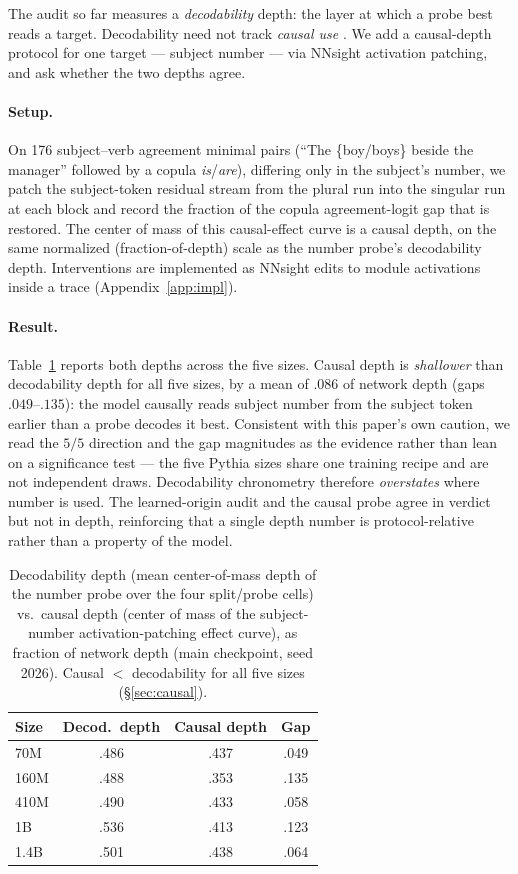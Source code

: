 \documentclass[11pt]{article}
\begin{document}
The audit so far measures a \emph{decodability} depth: the layer at which a probe best reads a target. Decodability need not track \emph{causal use} \citep{ravichander2021probing,elazar2021amnesic}. We add a causal-depth protocol for one target --- subject number --- via NNsight activation patching, and ask whether the two depths agree.

\paragraph{Setup.} On 176 subject--verb agreement minimal pairs (``The \{boy/boys\} beside the manager'' followed by a copula \emph{is}/\emph{are}), differing only in the subject's number, we patch the subject-token residual stream from the plural run into the singular run at each block and record the fraction of the copula agreement-logit gap that is restored. The center of mass of this causal-effect curve is a causal depth, on the same normalized (fraction-of-depth) scale as the number probe's decodability depth. Interventions are implemented as NNsight edits to module activations inside a trace (Appendix~\ref{app:impl}).

\paragraph{Result.} Table~\ref{tab:causal} reports both depths across the five sizes. Causal depth is \emph{shallower} than decodability depth for all five sizes, by a mean of $.086$ of network depth (gaps $.049$--$.135$): the model causally reads subject number from the subject token earlier than a probe decodes it best. Consistent with this paper's own caution, we read the $5/5$ direction and the gap magnitudes as the evidence rather than lean on a significance test --- the five Pythia sizes share one training recipe and are not independent draws. Decodability chronometry therefore \emph{overstates} where number is used. The learned-origin audit and the causal probe agree in verdict but not in depth, reinforcing that a single depth number is protocol-relative rather than a property of the model.

\begin{table}[t]
\centering\small
\setlength{\tabcolsep}{6pt}
\begin{tabular}{lccc}
\toprule
Size & Decod.\ depth & Causal depth & Gap \\
\midrule
70M   & .486 & .437 & .049 \\
160M  & .488 & .353 & .135 \\
410M  & .490 & .433 & .058 \\
1B    & .536 & .413 & .123 \\
1.4B  & .501 & .438 & .064 \\
\bottomrule
\end{tabular}
\caption{Decodability depth (mean center-of-mass depth of the number probe over the four split/probe cells) vs.\ causal depth (center of mass of the subject-number activation-patching effect curve), as fraction of network depth (main checkpoint, seed 2026). Causal $<$ decodability for all five sizes (\S\ref{sec:causal}).}
\label{tab:causal}
\end{table}
\end{document}
